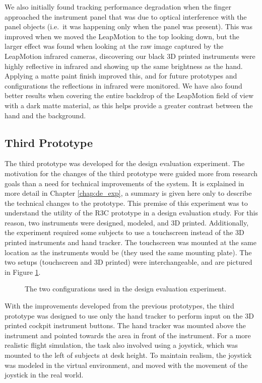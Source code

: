 We also initially found tracking performance degradation when the finger approached the instrument panel that was due to optical interference with the panel objects (i.e.\ it was happening only when the panel was present).
This was improved when we moved the LeapMotion to the top looking down, but the larger effect was found when looking at the raw image captured by the LeapMotion infrared cameras, discovering our black 3D printed instruments were highly reflective in infrared and showing up the same brightness as the hand.
Applying a matte paint finish improved this, and for future prototypes and configurations the reflections in infrared were monitored.
We have also found better results when covering the entire backdrop of the LeapMotion field of view with a dark matte material, as this helps provide a greater contrast between the hand and the background.


\subsection{Third Prototype}

The third prototype was developed for the design evaluation experiment.
The motivation for the changes of the third prototype were guided more from research goals than a need for technical improvements of the system.
It is explained in more detail in Chapter \ref{chap:de_exp}, a summary is given here only to describe the technical changes to the prototype.
This premise of this experiment was to understand the utility of the R3C prototype in a design evaluation study.
For this reason, two instruments were designed, modeled, and 3D printed.
Additionally, the experiment required some subjects to use a touchscreen instead of the 3D printed instruments and hand tracker.
The touchscreen was mounted at the same location as the instruments would be (they used the same mounting plate).
The two setups (touchscreen and 3D printed) were interchangeable, and are pictured in Figure \ref{fig:proto_design_exp}.

\begin{figure}
    \centering
    \caption{The two configurations used in the design evaluation experiment.}
    \label{fig:proto_design_exp}
\end{figure}

With the improvements developed from the previous prototypes, the third prototype was designed to use only the hand tracker to perform input on the 3D printed cockpit instrument buttons.
The hand tracker was mounted above the instrument and pointed towards the area in front of the instrument.
For a more realistic flight simulation, the task also involved using a joystick, which was mounted to the left of subjects at desk height.
To maintain realism, the joystick was modeled in the virtual environment, and moved with the movement of the joystick in the real world.

